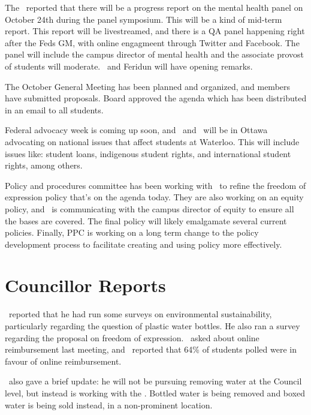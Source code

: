 \begin{information}

    The \pres\ reported that there will be a progress report on the mental
    health panel on October 24th during the panel symposium. This will be a
    kind of mid-term report. This report will be livestreamed, and there is
    a QA panel happening right after the Feds GM, with online engagmeent through
    Twitter and Facebook. The panel will include the campus director of mental 
    health and the associate provost of students will moderate. \antonio\ and 
    Feridun will have opening remarks.

    The October General Meeting has been planned and organized, and members 
    have submitted proposals. Board approved the agenda which has been
    distributed in an email to all students.

    Federal advocacy week is coming up soon, and \antonio\ and \andrewc\ will 
    be in Ottawa advocating on national issues that affect students at 
    Waterloo. This will include issues like: student loans, indigenous student
    rights, and international student rights, among others.  

    Policy and procedures committee has been working with \alex\ to refine the
    freedom of expression policy that's on the agenda today. They are also
    working on an equity policy, and \antonio\ is communicating with the campus 
    director of equity to ensure all the bases are covered. The final policy
    will likely emalgamate several current policies.  Finally, PPC is working 
    on a long term change to the policy development process to facilitate
    creating and using policy more effectively.

\end{information}

\section*{Councillor Reports}

\seneca\ reported that he had run some surveys on environmental 
sustainability, particularly regarding the question of plastic water 
bottles. He also ran a survey regarding the proposal on freedom of
expression. \brian\ asked about online reimbursement last meeting,
and \seneca\ reported that 64\% of students polled were in favour of
online reimbursement.

\jason\ also gave a brief update: he will not be pursuing removing water 
at the Council level, but instead is working with the \vpof. Bottled water 
is being removed and boxed water is being sold instead, in a non-prominent 
location. 

